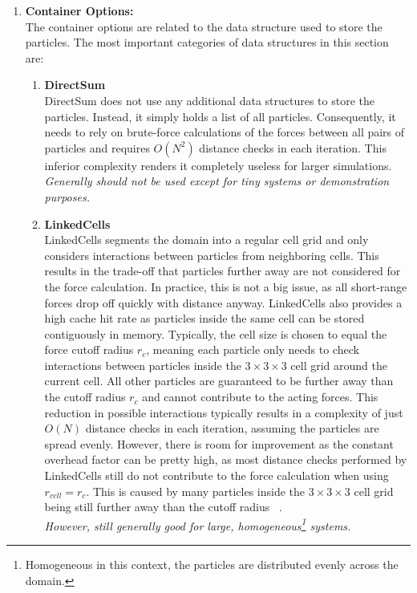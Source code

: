 \begin{enumerate}[label=\textbf{\arabic*.}]
      \item \textbf{Container Options:} \\
            The container options are related to the data structure used to store the particles. The most important categories of data structures in this section are:
            \begin{enumerate}
                  \item \textbf{DirectSum} \\
                        DirectSum does not use any additional data structures to store the particles. Instead, it simply holds a list of all particles. Consequently, it needs to rely on brute-force calculations of the forces between all pairs of particles and requires $O(N^2)$ distance checks in each iteration. This inferior complexity renders it completely useless for larger simulations.\\
                        \textit{Generally should not be used except for tiny systems or demonstration purposes.~\cite{VICCIONE2008625}}
                  \item \textbf{LinkedCells} \\
                        LinkedCells segments the domain into a regular cell grid and only considers interactions between particles from neighboring cells. This results in the trade-off that particles further away are not considered for the force calculation. In practice, this is not a big issue, as all short-range forces drop off quickly with distance anyway.
                        LinkedCells also provides a high cache hit rate as particles inside the same cell can be stored contiguously in memory. Typically, the cell size is chosen to equal the force cutoff radius $r_c$, meaning each particle only needs to check interactions between particles inside the $3\times3\times3$ cell grid around the current cell. All other particles are guaranteed to be further away than the cutoff radius $r_c$ and cannot contribute to the acting forces.
                        This reduction in possible interactions typically results in a complexity of just $O(N)$ distance checks in each iteration, assuming the particles are spread evenly. However, there is room for improvement as the constant overhead factor can be pretty high, as most distance checks performed by LinkedCells still do not contribute to the force calculation when using $r_{cell}=r_c$. This is caused by many particles inside the $3\times3\times3$ cell grid being still further away than the cutoff radius ~\cite{GRATL2019748}.\\
                        \textit{However, still generally good for large, homogeneous\footnote{Homogeneous in this context, the particles are distributed evenly across the domain.} systems.}


\end{enumerate}
\end{enumerate}
